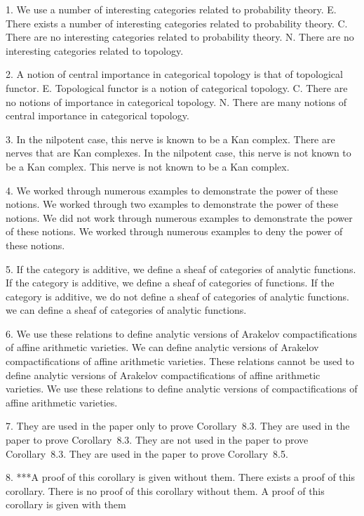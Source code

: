 
1. We use a number of interesting categories related to probability theory.
E. There exists a number of interesting categories related to probability theory.
C. There are no interesting categories related to probability theory.
N. There are no interesting categories related to topology.

2. A notion of central importance in categorical topology is that of topological functor.
E. Topological functor is a notion of categorical topology.
C. There are no notions of importance in categorical topology.
N. There are many  notions of central importance in categorical topology.

3. In the nilpotent case, this nerve is known to be a Kan complex.
There are nerves that are Kan complexes.
In the nilpotent case, this nerve is not known to be a Kan complex.
This nerve is not known to be a Kan complex.

4. We worked through numerous examples to demonstrate the power of these notions.
We worked through two examples to demonstrate the power of these notions.
We did not work through numerous examples to demonstrate the power of these notions.
We worked through numerous examples to deny the power of these notions.

5. If the category is additive, we define a sheaf of categories of analytic functions.
If the category is additive, we define a sheaf of categories of functions.
If the category is additive, we do not define a sheaf of categories of analytic functions.
we can define a sheaf of categories of analytic functions.

6. We use these relations to define analytic versions of Arakelov compactifications of affine arithmetic varieties.
We can define analytic versions of Arakelov compactifications of affine arithmetic varieties.
These relations cannot be used to define analytic versions of Arakelov compactifications of affine arithmetic varieties.
We use these relations to define analytic versions of  compactifications of affine arithmetic varieties.

7. They are used in the paper only to prove Corollary~8.3.
They are used in the paper  to prove Corollary~8.3.
They are not used in the paper  to prove Corollary~8.3.
They are used in the paper  to prove Corollary~8.5.

8. ***A proof of this corollary is given without them.
There exists a proof of this corollary.
There is no proof of this corollary without them.
A proof of this corollary is given with them

